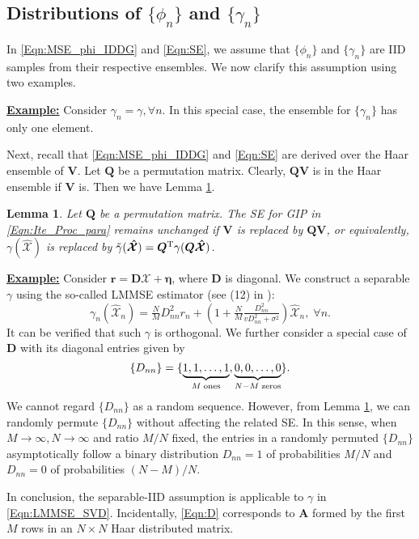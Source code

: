 \documentclass[journal]{IEEEtran}
\newcommand{\BE}{\begin{equation}}
\newcommand{\EE}{\end{equation}}
\renewcommand{\bf}{\bm}
\newtheorem{lemma}[theorem]{Lemma}
\begin{document}
\subsection{Distributions of \texorpdfstring{$\{\phi_n\}$}{TEXT}  and \texorpdfstring{$\{\gamma_n\}$}{TEXT}}\label{Sec:sep_fun}
In \eqref{Eqn:MSE_phi_IDDG} and \eqref{Eqn:SE}, we assume that $\{\phi_n\}$ and $\{\gamma_n\}$ are IID samples from their respective ensembles. We now clarify this assumption using two examples. 

\underline{{\textbf{Example:}}}   Consider $\gamma_n=\gamma, \forall n$. In this special case, the ensemble for $\{\gamma_n\}$ has only one element. 

Next, recall that \eqref{Eqn:MSE_phi_IDDG} and \eqref{Eqn:SE} are derived over the Haar ensemble of $\bf{V}$. Let $\bf{Q}$ be a permutation matrix. Clearly, $\bf{QV}$ is in the Haar ensemble if $\bf{V}$ is. Then we have Lemma \ref{Pro:random_gamma}.

\begin{lemma}\label{Pro:random_gamma}
Let $\bf{Q}$ be a permutation matrix. The SE for GIP in \eqref{Eqn:Ite_Proc_para} remains unchanged if $\bf{V}$ is replaced by $\bf{QV}$, or equivalently, $\gamma(\bf{\mathcal{\hat{X}}})$ is replaced by  $\tilde{\gamma}(\bf{\mathcal{\hat{X}}})=\bf{Q}^{\rm T}\gamma(\bf{Q\mathcal{\hat{X}}})$. 
\end{lemma}

\underline{{\textbf{Example:}}} Consider  ${\bf{r}}=\bf{D}\bf{\mathcal{X}} + \bf{\eta}$, where $\bf{D}$ is diagonal. We construct a separable $\gamma$ using the so-called LMMSE estimator (see (12) in \cite{Ma2016}):
\BE\label{Eqn:LMMSE_SVD}
\gamma_n(\mathcal{\hat{X}}_n) \!=\! \tfrac{N}{M}D_{nn}^2r_n\!+\!\left(1\!+\! \tfrac{N}{M}\tfrac{D_{nn}^2}{vD_{nn}^2+\sigma^2} \right)\!\mathcal{\hat{X}}_n, \; \forall n.
\EE
It can be verified that such $\gamma$ is orthogonal. We further consider a special case of $\bf{D}$ with its diagonal entries given by
\BE\label{Eqn:D}
\{D_{nn}\}=\{\underbrace{1,1,\dots, 1}_{M\; {\rm ones}}, \underbrace{0,0, \dots, 0}_{N-M\; {\rm zeros}}\}.
\EE
We cannot regard  $\{D_{nn}\}$ as a random sequence. However, from Lemma \ref{Pro:random_gamma}, we can randomly permute $\{D_{nn}\}$ without affecting the related SE. In this sense, when $M\to\infty, N\to\infty$ and ratio $M/N$ fixed, the entries in a randomly permuted $\{D_{nn}\}$ asymptotically follow a binary distribution $D_{nn}=1$ of probabilities $M/N$ and $D_{nn}=0$ of probabilities $(N-M)/N$.

In conclusion, the separable-IID assumption is applicable to $\gamma $ in \eqref{Eqn:LMMSE_SVD}. Incidentally, \eqref{Eqn:D} corresponds to $\bf{A}$ formed by the first $M$ rows in an $N\times N$ Haar distributed matrix. 
\end{document}
